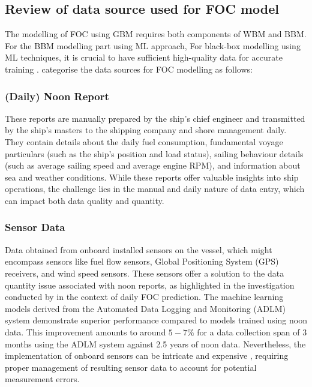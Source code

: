 \pagebreak

\subsection{Review of data source used for FOC model}\label{sec:data_use}

The modelling of FOC using GBM requires both components of WBM and BBM. For the BBM modelling part using ML approach, For black-box modelling using ML techniques, it is crucial to have sufficient high-quality data for accurate training .  categorise the data sources for FOC modelling as follows:
\\

\subsubsection*{\textbf{(Daily) Noon Report}} These reports are manually prepared by the ship's chief engineer and transmitted by the ship's masters to the shipping company and shore management daily. They contain details about the daily fuel consumption, fundamental voyage particulars (such as the ship's position and load status), sailing behaviour details (such as average sailing speed and average engine RPM), and information about sea and weather conditions. While these reports offer valuable insights into ship operations, the challenge lies in the manual and daily nature of data entry, which can impact both data quality and quantity.\\

\subsubsection*{\textbf{Sensor Data}} Data obtained from onboard installed sensors on the vessel, which might encompass sensors like fuel flow sensors, Global Positioning System (GPS) receivers, and wind speed sensors. These sensors offer a solution to the data quantity issue associated with noon reports, as highlighted in the investigation conducted by  in the context of daily FOC prediction. The machine learning models derived from the Automated Data Logging and Monitoring (ADLM) system demonstrate superior performance compared to models trained using noon data. This improvement amounts to around $5-7\%$ for a data collection span of 3 months using the ADLM system against 2.5 years of noon data. Nevertheless, the implementation of onboard sensors can be intricate and expensive , requiring proper management of resulting sensor data to account for potential measurement errors.\\

